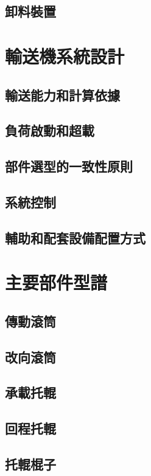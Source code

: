 \documentclass[UTF8]{ctexart}
\begin{document}
\subsection{卸料裝置}





\newpage
\section{輸送機系統設計}
\subsection{輸送能力和計算依據}
\subsection{負荷啟動和超載}
\subsection{部件選型的一致性原則}
\subsection{系統控制}
\subsection{輔助和配套設備配置方式}



\newpage
\section{主要部件型譜}
\subsection{傳動滾筒}
\subsection{改向滾筒}
\subsection{承載托輥}
\subsection{回程托輥}
\subsection{托輥棍子}
\end{document}
